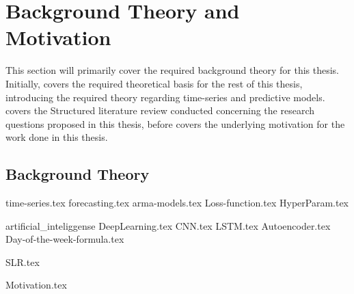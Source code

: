 \chapter{Background Theory and Motivation}\label{T-B}
\label{cha:TheoryAndBackground}


This section will primarily cover the required background theory for this thesis.
Initially,  covers the required theoretical basis for the rest of this thesis,
introducing the required theory regarding time-series and predictive models.
 covers the Structured literature review conducted concerning the research questions proposed in this thesis,
before  covers the underlying motivation for the work done in this thesis.



\section{Background Theory}
\label{section:BT:BackgroundTheory}
{time-series.tex}
{forecasting.tex}
{arma-models.tex}
{Loss-function.tex}
{HyperParam.tex}

{artificial_inteliggense}
{DeepLearning.tex}
{CNN.tex}
{LSTM.tex}
{Autoencoder.tex}
{Day-of-the-week-formula.tex}



{SLR.tex}


{Motivation.tex}
